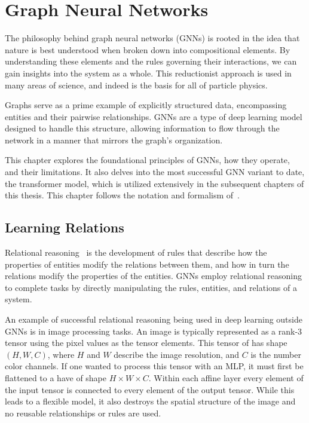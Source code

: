 \chapter{Graph Neural Networks}
\label{ch:gnns}

The philosophy behind graph neural networks (GNNs) is rooted in the idea that nature is best understood when broken down into compositional elements.
By understanding these elements and the rules governing their interactions, we can gain insights into the system as a whole.
This reductionist approach is used in many areas of science, and indeed is the basis for all of particle physics.

Graphs serve as a prime example of explicitly structured data, encompassing entities and their pairwise relationships. GNNs are a type of deep learning model designed to handle this structure, allowing information to flow through the network in a manner that mirrors the graph's organization.

This chapter explores the foundational principles of GNNs, how they operate, and their limitations.
It also delves into the most successful GNN variant to date, the transformer model, which is utilized extensively in the subsequent chapters of this thesis.
This chapter follows the notation and formalism of~\textcite{RelationalInductiveBiases}.

\section{Learning Relations}

Relational reasoning~\cite{SimpleNeuralNetwork} is the development of rules that describe how the properties of entities modify the relations between them, and how in turn the relations modify the properties of the entities.
GNNs employ relational reasoning to complete tasks by directly manipulating the rules, entities, and relations of a system.

An example of successful relational reasoning being used in deep learning outside GNNs is in image processing tasks.
An image is typically represented as a rank-3 tensor using the pixel values as the tensor elements.
This tensor of has shape $(H, W, C)$, where $H$ and $W$ describe the image resolution, and $C$ is the number color channels.
If one wanted to process this tensor with an MLP, it must first be flattened to a have of shape $H \times W \times C$.
Within each affine layer every element of the input tensor is connected to every element of the output tensor.
While this leads to a flexible model, it also destroys the spatial structure of the image and no reusable relationships or rules are used.

